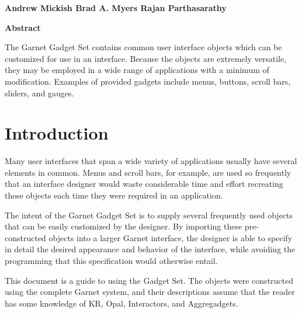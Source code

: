 \begin{titlepage}
\begin{titlebox}
\vspace{0.6 inch}

{\bf Andrew Mickish
Brad A. Myers
Rajan Parthasarathy}
\vspace{0.3 line}
\value{date}
\end{titlebox}
\vspace{0.5 inch}
\begin{center}
{\bf Abstract}\end{center}
\begin{text}
The Garnet Gadget Set contains common user interface objects which can
be customized for use in an interface.  Because the objects
are extremely versatile, they may be employed in a wide range of applications
with a minimum of modification.  Examples of provided gadgets include menus,
buttons, scroll bars, sliders, and gauges.


\vspace{0.5 inch}

\end{text}
\end{titlepage}




\chapter{Introduction}
Many user interfaces that span a wide variety of applications usually have
several elements in common.  Menus and scroll bars, for example, are used so
frequently that an interface designer would waste considerable time and effort
recreating those objects each time they were required in an application.

The intent of the Garnet Gadget Set is to supply several frequently used objects
that can be easily customized by the designer.  By importing these
pre-constructed objects into a larger Garnet interface, the designer is able
to specify in detail the desired appearance and behavior of the interface, while
avoiding the programming that this specification would otherwise entail.

This document is a guide to using the Gadget Set.  The objects
were constructed using the complete Garnet system, and their descriptions assume
that the reader has some knowledge of KR, Opal, Interactors, and Aggregadgets.


